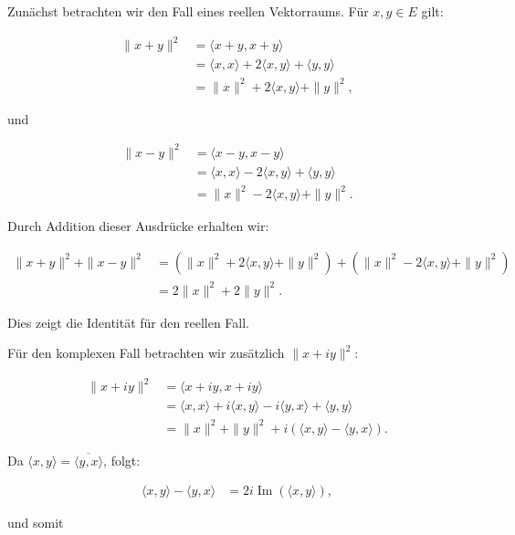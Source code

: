 
Zunächst betrachten wir den Fall eines reellen Vektorraums. Für $x, y \in E$ gilt:

\begin{align*}
\|x+y\|^2 &= \langle x+y, x+y \rangle \\
&= \langle x, x \rangle + 2 \langle x, y \rangle + \langle y, y \rangle \\
&= \|x\|^2 + 2 \langle x, y \rangle + \|y\|^2,
\end{align*}

und

\begin{align*}
\|x-y\|^2 &= \langle x-y, x-y \rangle \\
&= \langle x, x \rangle - 2 \langle x, y \rangle + \langle y, y \rangle \\
&= \|x\|^2 - 2 \langle x, y \rangle + \|y\|^2.
\end{align*}

Durch Addition dieser Ausdrücke erhalten wir:

\begin{align*}
\|x+y\|^2 + \|x-y\|^2 &= (\|x\|^2 + 2 \langle x, y \rangle + \|y\|^2) + (\|x\|^2 - 2 \langle x, y \rangle + \|y\|^2) \\
&= 2\|x\|^2 + 2\|y\|^2.
\end{align*}

Dies zeigt die Identität für den reellen Fall.

Für den komplexen Fall betrachten wir zusätzlich $\|x+iy\|^2$:

\begin{align*}
\|x+iy\|^2 &= \langle x+iy, x+iy \rangle \\
&= \langle x, x \rangle + i \langle x, y \rangle - i \langle y, x \rangle + \langle y, y \rangle \\
&= \|x\|^2 + \|y\|^2 + i(\langle x, y \rangle - \langle y, x \rangle).
\end{align*}

Da $\langle x, y \rangle = \overline{\langle y, x \rangle}$, folgt:

\begin{align*}
\langle x, y \rangle - \langle y, x \rangle &= 2i \operatorname{Im}(\langle x, y \rangle),
\end{align*}

und somit

